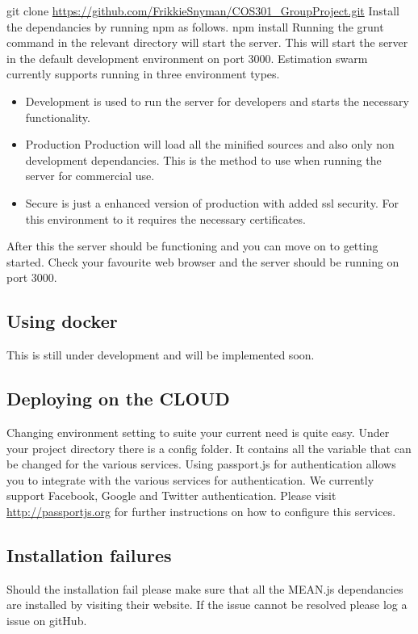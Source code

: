 git clone \url{https://github.com/FrikkieSnyman/COS301_GroupProject.git}
\newline
Install the dependancies by running npm as follows.
\newline
npm install
\newline
Running the grunt command in the relevant directory will start the server. This will start the server in the default development environment on port 3000. Estimation swarm currently supports running in three environment types.
\begin{itemize}
	\item{Development} is used to run the server for developers and starts the necessary functionality.
	\item{Production}
	Production will load all the minified sources and also only non development dependancies. This is the method to use when running the server for commercial use.
	\item{Secure} is just a enhanced version of production with added ssl security. For this environment to it requires the necessary certificates.
\end{itemize}
After this the server should be functioning and you can move on to getting started. Check your favourite web browser and the server should be running on port 3000.
\subsection{Using docker}
This is still under development and will be implemented soon.
\subsection{Deploying on the CLOUD}
Changing environment setting to suite your current need is quite easy. Under your project directory there is a config folder. It contains all the variable that can be changed for the various services. Using passport.js for authentication allows you to integrate with the various services for authentication. We currently support Facebook, Google and Twitter authentication. Please visit \url{http://passportjs.org} for further instructions on how to configure this services.
\subsection{Installation failures}
Should the installation fail please make sure that all the MEAN.js dependancies are installed by visiting their website. If the issue cannot be resolved please log a issue on gitHub.